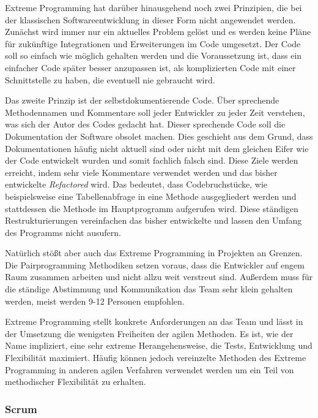                 Extreme Programming hat darüber hinausgehend noch zwei Prinzipien, die bei der klassischen Softwareentwicklung in dieser Form nicht angewendet werden. Zunächst wird immer nur ein aktuelles Problem gelöst und es werden keine Pläne für zukünftige Integrationen und Erweiterungen im Code umgesetzt. Der Code soll so einfach wie möglich gehalten werden und die Voraussetzung ist, dass ein einfacher Code später besser anzupassen ist, als komplizierten Code mit einer Schnittstelle zu haben, die eventuell nie gebraucht wird.

                Das zweite Prinzip ist der selbstdokumentierende Code. Über sprechende Methodennamen und Kommentare soll jeder Entwickler zu jeder Zeit verstehen, was sich der Autor des Codes gedacht hat. Dieser sprechende Code soll die Dokumentation der Software obsolet machen. Dies geschieht aus dem Grund, dass Dokumentationen häufig nicht aktuell sind oder nicht mit dem gleichen Eifer wie der Code entwickelt wurden und somit fachlich falsch sind. Diese Ziele werden erreicht, indem sehr viele Kommentare verwendet werden und das bisher entwickelte \emph{Refactored} wird. Das bedeutet, dass Codebruchstücke, wie beispielsweise eine Tabellenabfrage in eine Methode ausgegliedert werden und stattdessen die Methode im Hauptprogramm aufgerufen wird. Diese ständigen Restrukturierungen vereinfachen das bisher entwickelte und lassen den Umfang des Programms nicht ausufern.

                Natürlich stößt aber auch das Extreme Programming in Projekten an Grenzen. Die Pairprogramming Methodiken setzen voraus, dass die Entwickler auf engem Raum zusammen arbeiten und nicht allzu weit verstreut sind. Außerdem muss für die ständige Abstimmung und Kommunikation das Team sehr klein gehalten werden, meist werden 9-12 Personen empfohlen.

                Extreme Programming stellt konkrete Anforderungen an das Team und lässt in der Umsetzung die wenigsten Freiheiten der agilen Methoden. Es ist, wie der Name impliziert, eine sehr extreme Herangehensweise, die Tests, Entwicklung und Flexibilität maximiert. Häufig können jedoch vereinzelte Methoden des Extreme Programming in anderen agilen Verfahren verwendet werden um ein Teil von methodischer Flexibilität zu erhalten.

            \subsubsection{Scrum}

